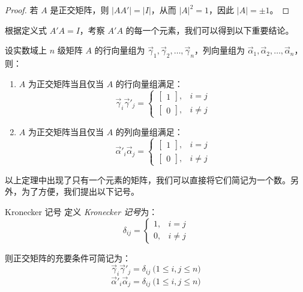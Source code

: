 \begin{proof}
	若 $A$ 是正交矩阵，则 $|AA'| = |I|$，从而 $|A|^2 = 1$，因此 $|A| = \pm 1$。
\end{proof}

根据定义式 $A'A = I$，考察 $A'A$ 的每一个元素，我们可以得到以下重要结论。

\begin{theorem}[正交矩阵的充要条件]
	设实数域上 $n$ 级矩阵 $A$ 的行向量组为 $\vec \gamma_1, \vec \gamma_2, \ldots, \vec \gamma_n$，列向量组为 $\vec \alpha_1, \vec \alpha_2, \ldots, \vec \alpha_n$，则：
	\begin{enumerate}
		\item $A$ 为正交矩阵当且仅当 $A$ 的行向量组满足：
		$$
		\vec \gamma_i \vec \gamma'_j =
		\begin{cases}
			\begin{bmatrix} 1 \end{bmatrix}, & i = j
			\\
			\begin{bmatrix} 0 \end{bmatrix}, & i \ne j
		\end{cases}
		$$
		\item $A$ 为正交矩阵当且仅当 $A$ 的列向量组满足：
		$$
		\vec \alpha'_i \vec \alpha_j =
		\begin{cases}
			\begin{bmatrix} 1 \end{bmatrix}, & i = j
			\\
			\begin{bmatrix} 0 \end{bmatrix}, & i \ne j
		\end{cases}
		$$
	\end{enumerate}
\end{theorem}

以上定理中出现了只有一个元素的矩阵，我们可以直接将它们简记为一个数。另外，为了方便，我们提出以下记号。

\begin{definition}{Kronecker 记号}
	定义 \emph{Kronecker 记号}为：
	$$
	\delta_{ij} =
	\begin{cases}
			1, & i = j
			\\
			0, & i \ne j
	\end{cases}
	$$
\end{definition}

则正交矩阵的充要条件可简记为：
$$
\vec \gamma_i \vec \gamma'_j = \delta_{ij} \pod{1 \le i, j \le n}
$$$$
\vec \alpha'_i \vec \alpha_j = \delta_{ij} \pod{1 \le i, j \le n}
$$

